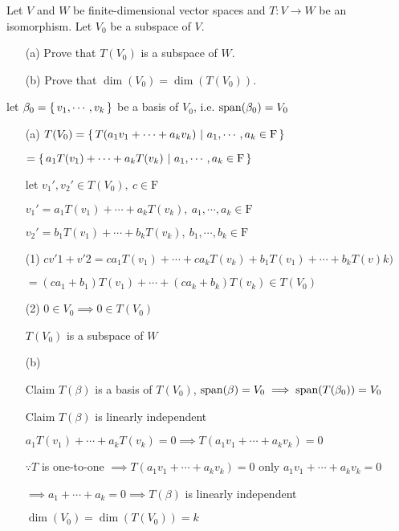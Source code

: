Let $V$ and $W$ be finite-dimensional vector spaces and $T:V \rightarrow W$ be an isomorphism. Let $V_0$ be a subspace of $V$.

\begin{enumerate}
	\item[(a)] Prove that $T(V_0)$ is a subspace of $W$.
	\item[(b)] Prove that $\dim (V_0) = \dim (T(V_0)).$ 
\end{enumerate}

\begin{tcolorbox}
	let $\beta_0 = \left\{ \,v_1,\cdots,v_k \,\right\}$ be a basis of $V_0$, i.e. $\text{span($\beta_0$)} = V_0$
	
	\begin{enumerate}
		\item[(a)] $T(V_0) = \left\{ \,T(a_1v_1+\cdots+a_kv_k)~|~a_1,\cdots,a_k \in \mathrm{F} \,\right\}$
		
		$= \left\{ \,a_1T(v_1)+\cdots+a_kT(v_k)~|~a_1,\cdots,a_k \in \mathrm{F} \,\right\}$
		
		let $v_1',v_2' \in T(V_0),~c\in \mathrm{F}$
		
		$v_1' = a_1T(v_1)+\cdots+a_kT(v_k),~a_1,\cdots,a_k \in \mathrm{F}$
		
		$v_2' = b_1T(v_1)+\cdots+b_kT(v_k),~b_1,\cdots,b_k \in \mathrm{F}$
		
		(1) $cv'1+v'2 = ca_1T(v_1) + \cdots + ca_kT(v_k)+b_1T(v_1)+\cdots+b_kT(v)k)$
		
		$=(ca_1+b_1)T(v_1)+\cdots + (ca_k+b_k)T(v_k) \in T(V_0)$
		
		(2) $0 \in V_0 \implies 0 \in T(V_0)$
		
		$T(V_0)$ is a subspace of $W$
		
		\item[(b)]
		
		Claim $T(\beta)$ is a basis of $T(V_0)$, $\text{span($\beta$)} = V_0 \implies \text{span($T(\beta_0)$)} = V_0$
		
		Claim $T(\beta)$ is linearly independent
		
		$a_1T(v_1)+\cdots+a_kT(v_k)=0 \implies T(a_1v_1 + \cdots + a_kv_k) = 0$
		
		$\because T$ is one-to-one $\implies T(a_1v_1+\cdots+a_kv_k) = 0$ only $a_1v_1 + \cdots + a_kv_k = 0$
		
		$\implies a_1+\cdots+a_k=0 \implies T(\beta)$ is linearly independent
		
		$\dim(V_0) = \dim(T(V_0)) = k$
	\end{enumerate}
\end{tcolorbox}